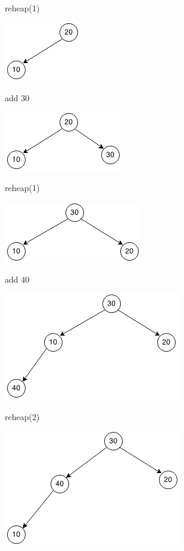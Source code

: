 \documentclass[10pt]{article}
\begin{document}
\begin{enumerate}
		\vspace{0.5cm}
		reheap(1)
		
		\vspace{0.5cm}
		\includegraphics[scale=0.5]{images/28_2_3.png}
		
		\vspace{0.5cm}
		add 30
		
		\vspace{0.5cm}
		\includegraphics[scale=0.5]{images/28_2_4.png}
		
		\vspace{0.5cm}
		reheap(1)

		\vspace{0.5cm}
		\includegraphics[scale=0.5]{images/28_2_5.png}
		
		\vspace{0.5cm}
		add 40
		
		\vspace{0.5cm}
		\includegraphics[scale=0.5]{images/28_2_6.png}
		
		\vspace{0.5cm}
		reheap(2)
		
		\vspace{0.5cm}
		\includegraphics[scale=0.5]{images/28_2_7.png}
		

\end{enumerate}
\end{document}
